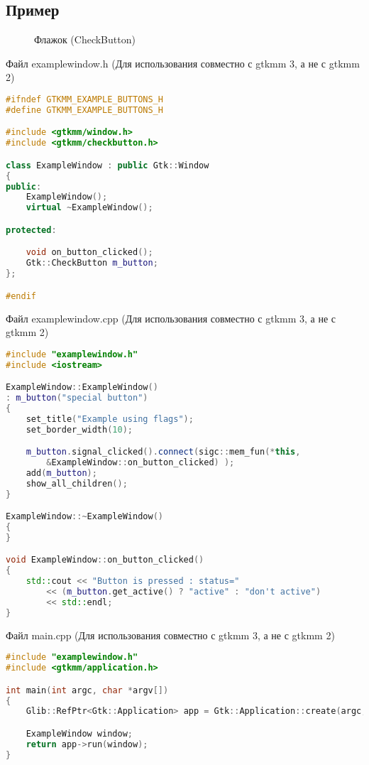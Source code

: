 \subsection{Пример}
\begin{figure}[h]
	\center{\texttt{[image: 52]}}
	\caption{Флажок (CheckButton)}
	\label{ris:image1}
\end{figure}

Файл examplewindow.h (Для использования совместно с gtkmm 3, а не с gtkmm 2)
\begin{lstlisting}[language=C++]
#ifndef GTKMM_EXAMPLE_BUTTONS_H
#define GTKMM_EXAMPLE_BUTTONS_H

#include <gtkmm/window.h>
#include <gtkmm/checkbutton.h>

class ExampleWindow : public Gtk::Window
{
public:
	ExampleWindow();
	virtual ~ExampleWindow();

protected:

	void on_button_clicked();
	Gtk::CheckButton m_button;
};

#endif 
\end{lstlisting}
Файл examplewindow.cpp (Для использования совместно с gtkmm 3, а не с gtkmm 2) 
\begin{lstlisting}[language=C++]
#include "examplewindow.h"
#include <iostream>

ExampleWindow::ExampleWindow()
: m_button("special button")
{
	set_title("Example using flags");
	set_border_width(10);

	m_button.signal_clicked().connect(sigc::mem_fun(*this,
		&ExampleWindow::on_button_clicked) );
	add(m_button);
	show_all_children();
}

ExampleWindow::~ExampleWindow()
{
}

void ExampleWindow::on_button_clicked()
{
	std::cout << "Button is pressed : status="
		<< (m_button.get_active() ? "active" : "don't active")
		<< std::endl;
}

\end{lstlisting}
Файл main.cpp (Для использования совместно с gtkmm 3, а не с gtkmm 2) 
\begin{lstlisting}[language=C++]
#include "examplewindow.h"
#include <gtkmm/application.h>

int main(int argc, char *argv[])
{
	Glib::RefPtr<Gtk::Application> app = Gtk::Application::create(argc, argv, "org.gtkmm.example");

	ExampleWindow window;
	return app->run(window);
}

\end{lstlisting}

